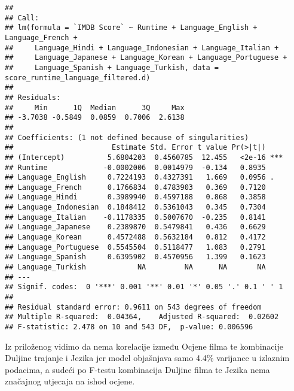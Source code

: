 \documentclass[
]{article}
\begin{document}
\begin{verbatim}
## 
## Call:
## lm(formula = `IMDB Score` ~ Runtime + Language_English + Language_French + 
##     Language_Hindi + Language_Indonesian + Language_Italian + 
##     Language_Japanese + Language_Korean + Language_Portuguese + 
##     Language_Spanish + Language_Turkish, data = score_runtime_language_filtered.d)
## 
## Residuals:
##     Min      1Q  Median      3Q     Max 
## -3.7038 -0.5849  0.0859  0.7006  2.6138 
## 
## Coefficients: (1 not defined because of singularities)
##                       Estimate Std. Error t value Pr(>|t|)    
## (Intercept)          5.6804203  0.4560785  12.455   <2e-16 ***
## Runtime             -0.0002006  0.0014979  -0.134   0.8935    
## Language_English     0.7224193  0.4327391   1.669   0.0956 .  
## Language_French      0.1766834  0.4783903   0.369   0.7120    
## Language_Hindi       0.3989940  0.4597188   0.868   0.3858    
## Language_Indonesian  0.1848412  0.5361043   0.345   0.7304    
## Language_Italian    -0.1178335  0.5007670  -0.235   0.8141    
## Language_Japanese    0.2389870  0.5479841   0.436   0.6629    
## Language_Korean      0.4572488  0.5632184   0.812   0.4172    
## Language_Portuguese  0.5545504  0.5118477   1.083   0.2791    
## Language_Spanish     0.6395902  0.4570956   1.399   0.1623    
## Language_Turkish            NA         NA      NA       NA    
## ---
## Signif. codes:  0 '***' 0.001 '**' 0.01 '*' 0.05 '.' 0.1 ' ' 1
## 
## Residual standard error: 0.9611 on 543 degrees of freedom
## Multiple R-squared:  0.04364,    Adjusted R-squared:  0.02602 
## F-statistic: 2.478 on 10 and 543 DF,  p-value: 0.006596
\end{verbatim}

Iz priloženog vidimo da nema korelacije između Ocjene filma te
kombinacije Duljine trajanje i Jezika jer model objašnjava samo 4.4\%
varijance u izlaznim podacima, a sudeći po F-testu kombinacija Duljine
filma te Jezika nema značajnog utjecaja na ishod ocjene.
\end{document}
